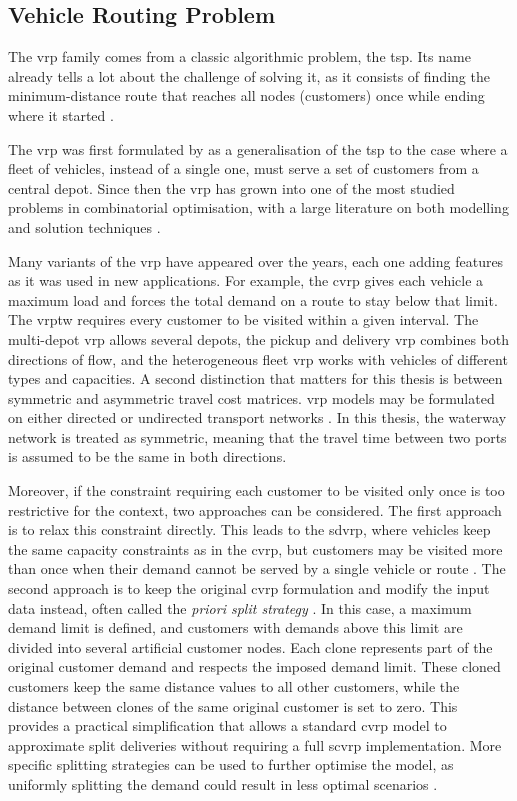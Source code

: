 \documentclass[12pt]{article}
\begin{document}
\subsection{Vehicle Routing Problem}
\label{subsec:vehicle-routing-problem}

The \acf{vrp} family comes from a classic algorithmic problem, the \acf{tsp}. Its name already tells a lot about the challenge of solving it, as it consists of finding the minimum-distance route that reaches all nodes (customers) once while ending where it started \parencite{tps}.

The \ac{vrp} was first formulated by \cite{dantzig1959truck} as a generalisation of the \ac{tsp} to the case where a fleet of vehicles, instead of a single one, must serve a set of customers from a central depot. Since then the \ac{vrp} has grown into one of the most studied problems in combinatorial optimisation, with a large literature on both modelling and solution techniques \parencite{VIDAL2020401}.

Many variants of the \ac{vrp} have appeared over the years, each one adding features as it was used in new applications. For example, the \acf{cvrp} gives each vehicle a maximum load and forces the total demand on a route to stay below that limit. The \ac{vrptw} requires every customer to be visited within a given interval. The multi-depot \ac{vrp} allows several depots, the pickup and delivery \ac{vrp} combines both directions of flow, and the heterogeneous fleet \ac{vrp} works with vehicles of different types and capacities. A second distinction that matters for this thesis is between symmetric and asymmetric travel cost matrices. \ac{vrp} models may be formulated on either directed or undirected transport networks \parencite{BRAEKERS2016300}. In this thesis, the waterway network is treated as symmetric, meaning that the travel time between two ports is assumed to be the same in both directions.

Moreover, if the constraint requiring each customer to be visited only once is too restrictive for the context, two approaches can be considered. The first approach is to relax this constraint directly. This leads to the \acf{sdvrp}, where vehicles keep the same capacity constraints as in the \ac{cvrp}, but customers may be visited more than once when their demand cannot be served by a single vehicle or route \parencite{ARCHETTI2011741}. The second approach is to keep the original \ac{cvrp} formulation and modify the input data instead, often called the \textit{priori split strategy} \parencite{a17090396}. In this case, a maximum demand limit is defined, and customers with demands above this limit are divided into several artificial customer nodes. Each clone represents part of the original customer demand and respects the imposed demand limit. These cloned customers keep the same distance values to all other customers, while the distance between clones of the same original customer is set to zero. This provides a practical simplification that allows a standard \ac{cvrp} model to approximate split deliveries without requiring a full \ac{scvrp} implementation. More specific splitting strategies can be used to further optimise the model, as uniformly splitting the demand could result in less optimal scenarios \parencite{a17090396}.
\end{document}
